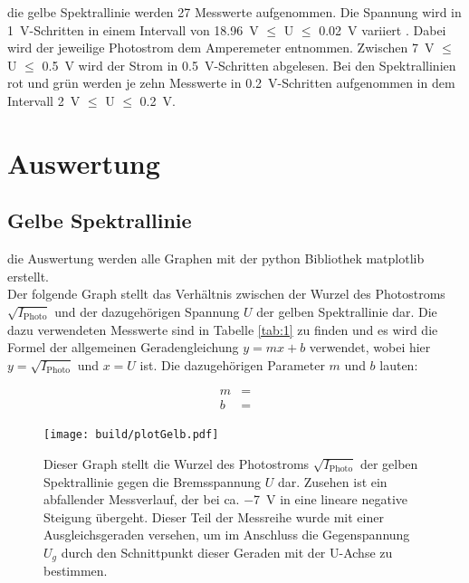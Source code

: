     \justifying die gelbe Spektrallinie werden 27 Messwerte aufgenommen. Die Spannung wird in \SI{1}{\volt}-Schritten in einem Intervall von 
    \SI{18.96}{\volt} $\leq$ U $\leq$ \SI{0.02}{\volt} variiert . Dabei wird der jeweilige Photostrom dem Amperemeter entnommen. Zwischen \SI{7}{\volt} $\leq$ U $\leq$ \SI{0.5}{\volt}
    wird der Strom in \SI{0.5}{\volt}-Schritten abgelesen.
    Bei den Spektrallinien rot und grün werden je zehn Messwerte in \SI{0.2}{\volt}-Schritten aufgenommen in dem Intervall \SI{2}{\volt} $\leq$ U $\leq$ \SI{0.2}{\volt}. 

\section{Auswertung}

\subsection{Gelbe Spektrallinie}

    \justifying die Auswertung werden alle Graphen mit der python Bibliothek matplotlib \cite{matplotlib} erstellt.\\
    Der folgende Graph stellt das Verhältnis zwischen der Wurzel des Photostroms $\sqrt{I_{\text{Photo}}}$ und der dazugehörigen Spannung $U$ der gelben Spektrallinie dar. Die dazu verwendeten Messwerte sind 
    in Tabelle \ref{tab:1} zu finden und es wird die Formel der allgemeinen Geradengleichung $y=mx+b$ verwendet, wobei hier $y=\sqrt{I_{\text{Photo}}}$ und $x=U$ ist. Die dazugehörigen 
    Parameter $m$ und $b$ lauten:

    \begin{align}
    m &= \text{} \label{eq:5}\\
    b &= \text{} \label{eq:6}
    \end{align}

    \begin{figure}[H]
        \centering
        \texttt{[image: build/plotGelb.pdf]}
        \caption{Dieser Graph stellt die Wurzel des Photostroms $\sqrt{I_{\text{Photo}}}$ der gelben Spektrallinie gegen die Bremsspannung $U$ dar. Zusehen ist ein abfallender Messverlauf, der
        bei ca. \SI{-7}{\volt} in eine lineare negative Steigung übergeht. Dieser Teil der Messreihe wurde mit einer Ausgleichsgeraden versehen, um im Anschluss die Gegenspannung
        $U_g$ durch den Schnittpunkt dieser Geraden mit der U-Achse zu bestimmen.}
        \label{fig:7}
    \end{figure}

